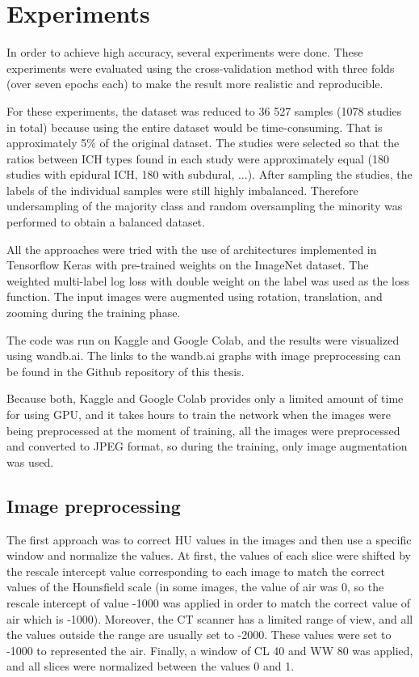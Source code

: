 \documentclass[thesis=B,english]{FITthesis}[2019/12/23]
\begin{document}
\section{Experiments}
In order to achieve high accuracy, several experiments were done. These experiments were evaluated using the cross-validation method with three folds (over seven epochs each) to make the result more realistic and reproducible.

For these experiments, the dataset was reduced to 36 527 samples (1078 studies in total) because using the entire dataset would be time-consuming. That is approximately 5\% of the original dataset. The studies were selected so that the ratios between ICH types found in each study were approximately equal (180 studies with epidural ICH, 180 with subdural, ...). After sampling the studies, the labels of the individual samples were still highly imbalanced. Therefore undersampling of the majority class and random oversampling the minority was performed to obtain a balanced dataset.

All the approaches were tried with the use of architectures implemented in Tensorflow Keras with pre-trained weights on the ImageNet dataset. The weighted multi-label log loss with double weight on the  label was used as the loss function. The input images were augmented using rotation, translation, and zooming during the training phase.

The code was run on Kaggle and Google Colab, and the results were visualized using wandb.ai. The links to the wandb.ai graphs with image preprocessing can be found in the Github repository of this thesis.

Because both, Kaggle and Google Colab provides only a limited amount of time for using GPU, and it takes hours to train the network when the images were being preprocessed at the moment of training, all the images were preprocessed and converted to JPEG format, so during the training, only image augmentation was used.

\subsection{Image preprocessing}
The first approach was to correct HU values in the images and then use a specific window and normalize the values. At first, the values of each slice were shifted by the rescale intercept value corresponding to each image to match the correct values of the Hounsfield scale (in some images, the value of air was 0, so the rescale intercept of value -1000 was applied in order to match the correct value of air which is -1000). Moreover, the CT scanner has a limited range of view, and all the values outside the range are usually set to -2000. These values were set to -1000 to represented the air. Finally, a window of CL 40 and WW 80 was applied, and all slices were normalized between the values 0 and 1.
\end{document}
